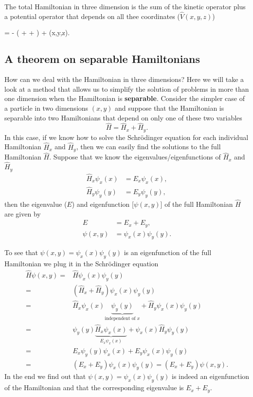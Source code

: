 The total Hamiltonian in three dimension is the sum of the kinetic operator plus a potential operator that depends on all thee coordinates ($\hat{V}(x,y,z)$)
\begin{iequation}
 = -
\left( +  +  \right) + (x,y,z).
\end{iequation}

\subsection{A theorem on separable Hamiltonians}
How can we deal with the Hamiltonian in three dimensions?
Here we will take a look at a method that allows us to simplify the solution of problems in more than one dimension when the Hamiltonian is \textbf{separable}.
Consider the simpler case of a particle in two dimensions $(x,y)$ and suppose that the Hamiltonian is separable into two Hamiltonians that depend on only one of these two variables
\begin{equation}
\hat{H} = \hat{H}_x + \hat{H}_y. 
\end{equation}
In this case, if we know how to solve the Schr\"{o}dinger equation for each individual Hamiltonian $\hat{H}_x$ and $\hat{H}_y$, then we can easily find the solutions to the full Hamiltonian $\hat{H}$.
Suppose that we know the eigenvalues/eigenfunctions of $\hat{H}_x$ and $\hat{H}_y$
\begin{align}
\hat{H}_x \psi_x(x) &= E_x \psi_x(x), \\
\hat{H}_y \psi_y(y) &= E_y \psi_y(y),
\end{align}
then the eigenvalue ($E$) and eigenfunction [$\psi(x,y)$] of the full Hamiltonian $\hat{H}$ are given by
\begin{align}
E &= E_x + E_y, \\
\psi(x,y) &= \psi_x(x) \psi_y(y).
\end{align}

To see that $\psi(x,y) = \psi_x(x) \psi_y(y)$ is an eigenfunction of the full Hamiltonian we plug it in the Schr\"{o}dinger equation
\begin{equation}
\begin{split}
\hat{H} \psi(x,y) =& \hat{H}  \psi_x(x) \psi_y(y) \\
 =& (\hat{H}_x + \hat{H}_y)\psi_x(x) \psi_y(y) \\
=& \hat{H}_x\psi_x(x) \underbrace{\psi_y(y)}_{\text{independent of } x} + \hat{H}_y\psi_x(x) \psi_y(y) \\
=& \psi_y(y) \underbrace{\hat{H}_x\psi_x(x)}_{E_x\psi_x(x)} + \psi_x(x) \hat{H}_y \psi_y(y) \\
=& E_x \psi_y(y)\psi_x(x) + E_y \psi_x(x)  \psi_y(y) \\
=& (E_x + E_y) \psi_x(x)  \psi_y(y) = (E_x + E_y) \psi(x,y).
\end{split}
\end{equation}
In the end we find out that $\psi(x,y) = \psi_x(x) \psi_y(y)$ is indeed an eigenfunction of the Hamiltonian and that the corresponding eigenvalue is $E_x + E_y$.

